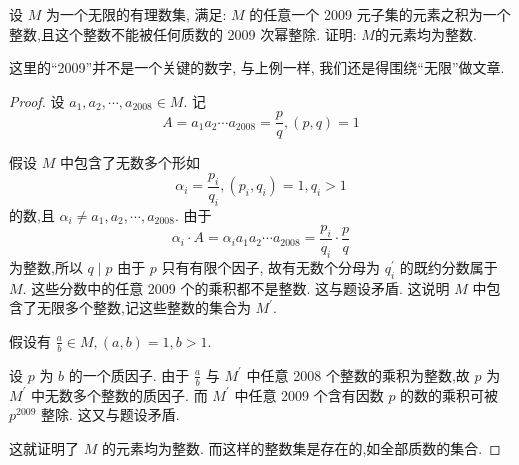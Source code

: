 \begin{example}
	设 $M$ 为一个无限的有理数集, 满足: $M$ 的任意一个 2009 元子集的元素之积为一个整数,且这个整数不能被任何质数的 2009 次幂整除. 证明: $M$的元素均为整数.
\end{example}
\begin{analysis}
	这里的“2009”并不是一个关键的数字, 与上例一样, 我们还是得围绕“无限”做文章.
\end{analysis}
\begin{proof}
	设 $a_{1}, a_{2}, \cdots, a_{2008} \in M$. 记
	$$
		A=a_{1} a_{2} \cdots a_{2008}=\frac{p}{q},(p, q)=1
	$$

	假设 $M$ 中包含了无数多个形如
	$$
		\alpha_{i}=\frac{p_{i}}{q_{i}},\left(p_{i}, q_{i}\right)=1, q_{i}>1
	$$
	的数,且 $\alpha_{i} \neq a_{1}, a_{2}, \cdots, a_{2008}$. 由于
	$$
		\alpha_{i} \cdot A=\alpha_{i} a_{1} a_{2} \cdots a_{2008}=\frac{p_{i}}{q_{i}} \cdot \frac{p}{q}
	$$
	为整数,所以
	$q \mid p$
	由于 $p$ 只有有限个因子, 故有无数个分母为 $q_{i}^{\prime}$ 的既约分数属于 $M$. 这些分数中的任意 2009 个的乘积都不是整数. 这与题设矛盾. 这说明 $M$ 中包含了无限多个整数,记这些整数的集合为 $M^{\prime}$.

	假设有 $\frac{a}{b} \in M,(a, b)=1, b>1$.

	设 $p$ 为 $b$ 的一个质因子. 由于 $\frac{a}{b}$ 与 $M^{\prime}$ 中任意 2008 个整数的乘积为整数,故 $p$ 为 $M^{\prime}$ 中无数多个整数的质因子. 而 $M^{\prime}$ 中任意 2009 个含有因数 $p$ 的数的乘积可被 $p^{2009}$ 整除. 这又与题设矛盾.

	这就证明了 $M$ 的元素均为整数. 而这样的整数集是存在的,如全部质数的集合.
\end{proof}

